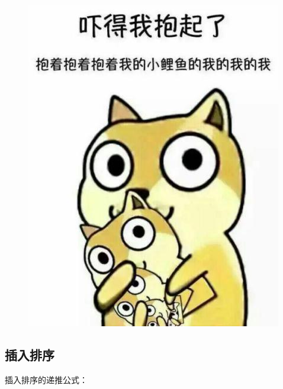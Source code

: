\begin{figure}[H]
    \centering
    \includegraphics[]{img/C11/11-3/2.png}
\end{figure}

\subsection{插入排序}

插入排序的递推公式：